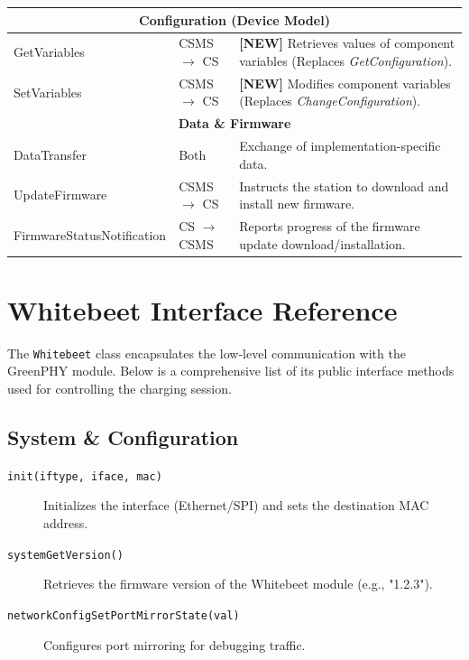 \documentclass[a4paper,11pt]{report}
\begin{document}
\begin{center}
\begin{tabular}{|p{}|p{}|p{}|}
\multicolumn{3}{|c|}{\textbf{Configuration (Device Model)}} \\ \hline
GetVariables & CSMS $\to$ CS & \textbf{[NEW]} Retrieves values of component variables (Replaces \textit{GetConfiguration}). \\ \hline
SetVariables & CSMS $\to$ CS & \textbf{[NEW]} Modifies component variables (Replaces \textit{ChangeConfiguration}). \\ \hline

\multicolumn{3}{|c|}{\textbf{Data \& Firmware}} \\ \hline
DataTransfer & Both & Exchange of implementation-specific data. \\ \hline
UpdateFirmware & CSMS $\to$ CS & Instructs the station to download and install new firmware. \\ \hline
FirmwareStatusNotification & CS $\to$ CSMS & Reports progress of the firmware update download/installation. \\ \hline

\end{tabular}
\end{center}

\chapter{Whitebeet Interface Reference}
The \texttt{Whitebeet} class encapsulates the low-level communication with the GreenPHY module. Below is a comprehensive list of its public interface methods used for controlling the charging session.

\section{System \& Configuration}
\begin{description}
    \item[\texttt{init(iftype, iface, mac)}] Initializes the interface (Ethernet/SPI) and sets the destination MAC address.
    \item[\texttt{systemGetVersion()}] Retrieves the firmware version of the Whitebeet module (e.g., "1.2.3").
    \item[\texttt{networkConfigSetPortMirrorState(val)}] Configures port mirroring for debugging traffic.
\end{description}
\end{document}
